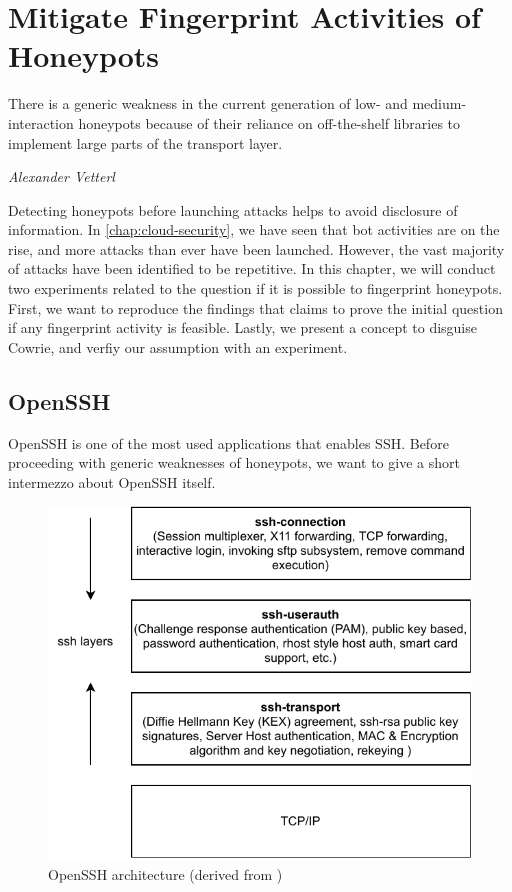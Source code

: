 \chapter{Mitigate Fingerprint Activities of Honeypots}
\label{chap:fingerprinting}

\epigraph{There is a generic weakness in the current generation of low- and medium-interaction honeypots because of their reliance on off-the-shelf libraries to implement large parts of the transport layer.}{\textit{Alexander Vetterl}}

Detecting honeypots before launching attacks helps to avoid disclosure of information.
In \autoref{chap:cloud-security}, we have seen that bot activities are on the rise, and more attacks than ever have been launched.
However, the vast majority of attacks have been identified to be repetitive.
In this chapter, we will conduct two experiments related to the question if it is possible to fingerprint honeypots.
First, we want to reproduce the findings that \citet{vetterl2020} claims to prove the initial question if any fingerprint activity is feasible.
Lastly, we present a concept to disguise Cowrie, and verfiy our assumption with an experiment.

\section{OpenSSH}
\label{sec:openssh}

OpenSSH is one of the most used applications that enables SSH.
Before proceeding with generic weaknesses of honeypots, we want to give a short intermezzo about OpenSSH itself.

\begin{figure}
    \centering
    \includegraphics{figures/openssh-architecture.pdf}
    \caption[OpenSSH architecture]{OpenSSH architecture (derived from \cite{openssh2007})}
    \label{fig:openssh-architecture}
\end{figure}

